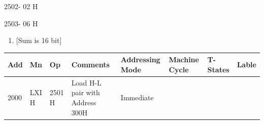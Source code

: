 \documentclass[11pt,twocolumn]{article}
\begin{document}
2502- 02 H

2503- 06 H

\pagebreak

\begin{enumerate}
\def\labelenumi{\alph{enumi})}
\setcounter{enumi}{1}
\tightlist
\item
  {[}Sum is 16 bit{]}
\end{enumerate}

\begin{longtable}[]{@{}llllllll@{}}
\toprule
\begin{minipage}[b]{0.04\columnwidth}\raggedright
Add\strut
\end{minipage} & \begin{minipage}[b]{0.05\columnwidth}\raggedright
Mn\strut
\end{minipage} & \begin{minipage}[b]{0.05\columnwidth}\raggedright
Op\strut
\end{minipage} & \begin{minipage}[b]{0.23\columnwidth}\raggedright
Comments\strut
\end{minipage} & \begin{minipage}[b]{0.09\columnwidth}\raggedright
Addressing Mode\strut
\end{minipage} & \begin{minipage}[b]{0.25\columnwidth}\raggedright
Machine Cycle\strut
\end{minipage} & \begin{minipage}[b]{0.05\columnwidth}\raggedright
T-States\strut
\end{minipage} & \begin{minipage}[b]{0.03\columnwidth}\raggedright
Lable\strut
\end{minipage}\tabularnewline
\midrule
\endhead
\begin{minipage}[t]{0.04\columnwidth}\raggedright
2000\strut
\end{minipage} & \begin{minipage}[t]{0.05\columnwidth}\raggedright
LXI H\strut
\end{minipage} & \begin{minipage}[t]{0.05\columnwidth}\raggedright
2501 H\strut
\end{minipage} & \begin{minipage}[t]{0.23\columnwidth}\raggedright
Load H-L pair with Address 300H\strut
\end{minipage} & \begin{minipage}[t]{0.09\columnwidth}\raggedright
Immediate\strut

\end{minipage}
\end{longtable}
\end{document}
